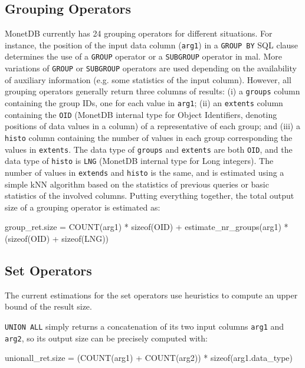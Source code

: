\documentclass[conference]{IEEEtran}
\def\Skip{\par\medskip\nobreak\noindent}
\begin{document}
\subsection{Grouping Operators}
MonetDB currently has 24 grouping operators for different situations.
For instance, the position of the input data column (\texttt{\small arg1}) in a \texttt{\small GROUP BY} SQL clause determines the use of a \texttt{\small GROUP} operator or a \texttt{\small SUBGROUP} operator in {\sc mal}.
More variations of \texttt{\small GROUP} or \texttt{\small SUBGROUP} operators are used depending on the availability of auxiliary information (e.g. some statistics of the input column).
However, all grouping operators generally return three columns of results: (i) a \texttt{\small groups} column containing the group IDs, one for each value in \texttt{\small arg1}; (ii) an \texttt{\small extents} column containing the \texttt{\small OID} (MonetDB internal type for Object Identifiers, denoting positions of data values in a column) of a representative of each group; and (iii) a \texttt{\small histo} column containing the number of values in each group corresponding the values in \texttt{\small extents}.
The data type of \texttt{\small groups} and \texttt{\small extents} are both \texttt{\small OID}, and the data type of \texttt{\small histo} is \texttt{\small LNG} (MonetDB internal type for Long integers).
The number of values in \texttt{\small extends} and \texttt{\small histo} is the same, and is estimated using a simple kNN algorithm based on the statistics of previous queries or basic statistics of the involved columns.
Putting everything together, the total output size of a grouping operator is estimated as:
\begin{verb}
group_ret.size = COUNT(arg1) * sizeof(OID) +
  estimate_nr_groups(arg1) * (sizeof(OID) + sizeof(LNG))
\end{verb}

\subsection{Set Operators}
The current estimations for the set operators use heuristics to compute an upper bound of the result size.

\texttt{\small UNION ALL} simply returns a concatenation of its two input columns \texttt{\small arg1} and \texttt{\small arg2}, so its output size can be precisely computed with:
\begin{verb}
unionall_ret.size = (COUNT(arg1) + COUNT(arg2)) * 
  sizeof(arg1.data_type)
\end{verb}
\end{document}
